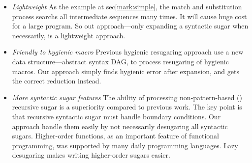 \begin{itemize}
	\item \emph{Lightweight} As the example at sec\ref{mark:simple}, the match and substitution process searchs all intermediate sequences many times. It will cause huge cost for a large program. So out approach---only expanding a syntactic sugar when necessarily, is a lightweight approach.
	\item \emph{Friendly to hygienic macro} Previous hygienic resugaring approach use a new data structure---abstract syntax DAG, to process resugaring of hygienic macros. Our approach simply finds hygienic error after expansion, and gets the correct reduction instead. 
	\item \emph{More syntactic sugar features} The ability of processing non-pattern-based () recursive sugar is a superiority compared to previous work. The key point is that recursive syntactic sugar must handle boundary conditions. Our approach handle them easily by not necessarily desugaring all syntactic sugars. Higher-order functions, as an important feature of functional programming, was supported by many daily programming languages. Lazy desugaring makes writing higher-order sugars easier.
\end{itemize}

